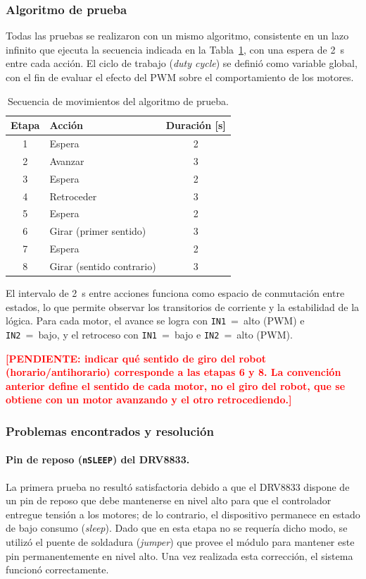 \documentclass[12pt,a4paper]{article}
\newcommand{\pendiente}[1]{\textcolor{red}{\textbf{[PENDIENTE: #1]}}}
\begin{document}
\subsubsection{Algoritmo de prueba}
Todas las pruebas se realizaron con un mismo algoritmo, consistente en un lazo infinito que ejecuta la secuencia indicada en la Tabla~\ref{tab:secuencia}, con una espera de \SI{2}{s} entre cada acción. El ciclo de trabajo (\emph{duty cycle}) se definió como variable global, con el fin de evaluar el efecto del PWM sobre el comportamiento de los motores.

\begin{table}[H]
\centering
\caption{Secuencia de movimientos del algoritmo de prueba.}
\label{tab:secuencia}
\begin{tabular}{clc}
\toprule
Etapa & Acción & Duración [s] \\
\midrule
1 & Espera & 2 \\
2 & Avanzar & 3 \\
3 & Espera & 2 \\
4 & Retroceder & 3 \\
5 & Espera & 2 \\
6 & Girar (primer sentido) & 3 \\
7 & Espera & 2 \\
8 & Girar (sentido contrario) & 3 \\
\bottomrule
\end{tabular}
\end{table}

\begin{visar}
El intervalo de \SI{2}{s} entre acciones funciona como espacio de conmutación entre estados, lo que permite observar los transitorios de corriente y la estabilidad de la lógica. Para cada motor, el avance se logra con \texttt{IN1}~=~alto (PWM) e \texttt{IN2}~=~bajo, y el retroceso con \texttt{IN1}~=~bajo e \texttt{IN2}~=~alto (PWM).
\end{visar}
\pendiente{indicar qué sentido de giro del robot (horario/antihorario) corresponde a las etapas 6 y 8. La convención anterior define el sentido de cada motor, no el giro del robot, que se obtiene con un motor avanzando y el otro retrocediendo.}

\subsubsection{Problemas encontrados y resolución}

\paragraph{Pin de reposo (\texttt{nSLEEP}) del DRV8833.}
La primera prueba no resultó satisfactoria debido a que el DRV8833 dispone de un pin de reposo que debe mantenerse en nivel alto para que el controlador entregue tensión a los motores; de lo contrario, el dispositivo permanece en estado de bajo consumo (\emph{sleep}). Dado que en esta etapa no se requería dicho modo, se utilizó el puente de soldadura (\emph{jumper}) que provee el módulo para mantener este pin permanentemente en nivel alto. Una vez realizada esta corrección, el sistema funcionó correctamente.
\end{document}

